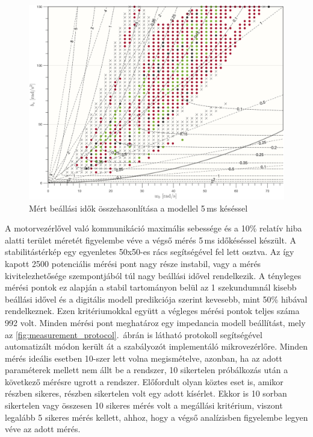 \begin{figure}[b!]
	\begin{center}
		\includegraphics[width=\textwidth]{images/experiment_comparison_0005.png}
		\caption{Mért beállási idők összehasonlítása a modellel 5\,ms késéssel}\label{fig:experiment_comparison_0005}
	\end{center}
\end{figure}

A motorvezérlővel való kommunikáció maximális sebessége és a 10\% relatív hiba alatti terület méretét figyelembe véve 
a végső mérés 5\,ms időkéséssel készült. A stabilitástérkép egy egyenletes 50x50-es rács segítségével fel lett 
osztva. Az így kapott 2500 potenciális mérési pont nagy része instabil, vagy a mérés kivitelezhetősége szempontjából 
túl nagy beállási idővel rendelkezik. A tényleges mérési pontok ez alapján a stabil tartományon belül az 1 szekundumnál 
kisebb beállási idővel és a digitális modell predikciója szerint kevesebb, mint 50\% hibával rendelkeznek. Ezen kritériumokkal 
együtt a végleges mérési pontok teljes száma 992 volt. Minden mérési pont meghatároz egy impedancia modell beállítást, mely 
az \ref{fig:measurement_protocol}.~ábrán is látható protokoll segítségével automatizált módon került át a szabályozót 
implementáló mikrovezérlőre. Minden mérés ideális esetben 10-szer lett volna megismételve, azonban, ha az adott paraméterek mellett 
nem állt be a rendszer, 10 sikertelen próbálkozás után a következő mérésre ugrott a rendszer. Előfordult olyan köztes eset is, 
amikor részben sikeres, részben sikertelen volt egy adott kísérlet. Ekkor is 10 sorban sikertelen vagy összesen 10 sikeres 
mérés volt a megállási kritérium, viszont legalább 5 sikeres mérés kellett, ahhoz, hogy a végső analízisben figyelembe legyen 
véve az adott mérés.



